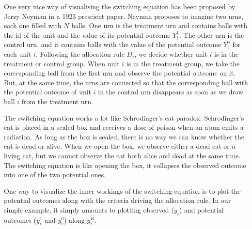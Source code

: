 \documentclass[]{book}
\theoremstyle{definition}
\theoremstyle{definition}
\theoremstyle{definition}
\theoremstyle{remark}
\let\BeginKnitrBlock\begin \let\EndKnitrBlock\end
\begin{document}
One very nice way of visualising the switching equation has been
proposed by Jerzy Neyman in a 1923 prescient paper. Neyman proposes to
imagine two urns, each one filled with \(N\) balls. One urn is the
treatment urn and contains balls with the id of the unit and the value
of its potential outcome \(Y_i^1\). The other urn is the control urn,
and it contains balls with the value of the potential outcome \(Y_i^0\)
for each unit \(i\). Following the allocation rule \(D_i\), we decide
whether unit \(i\) is in the treatment or control group. When unit \(i\)
is in the treatment group, we take the corresponding ball from the first
urn and observe the potential outcome on it. But, at the same time, the
urns are connected so that the corresponding ball with the potential
outcome of unit \(i\) in the control urn disappears as soon as we draw
ball \(i\) from the treatment urn.

The switching equation works a lot like Schrodinger's cat paradox.
Schrodinger's cat is placed in a sealed box and receives a dose of
poison when an atom emits a radiation. As long as the box is sealed,
there is no way we can know whether the cat is dead or alive. When we
open the box, we observe either a dead cat or a living cat, but we
cannot observe the cat both alice and dead at the same time. The
switching equation is like opening the box, it collapses the observed
outcome into one of the two potential ones.

\BeginKnitrBlock{example}
\protect\hypertarget{exm:unnamed-chunk-5}{}{\label{exm:unnamed-chunk-5} }One
way to visualize the inner workings of the switching equation is to plot
the potential outcomes along with the criteria driving the allocation
rule. In our simple example, it simply amounts to plotting observed
(\(y_i\)) and potential outcomes (\(y_i^1\) and \(y_i^0\)) along
\(y_i^B\).
\EndKnitrBlock{example}
\end{document}
